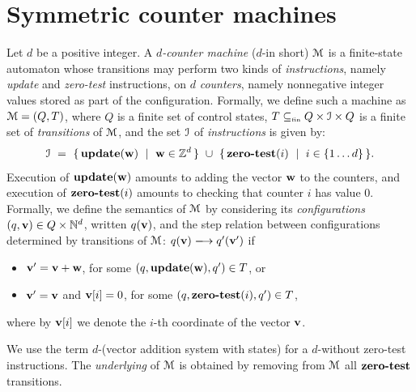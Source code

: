 \section{Symmetric counter machines} \label{sec:model}

Let $d$ be a positive integer.
A \emph{$d$-counter machine} ($d$-\cm in short) 
$\mathcal{M}$
is a finite-state automaton whose transitions
may perform two kinds of \emph{instructions},
namely \emph{update} and \emph{zero-test} instructions,
on $d$ \emph{counters}, namely nonnegative integer values
stored as part of the configuration.
Formally, we define such a machine as 
$\mathcal{M} = (Q,T)$, where $Q$ is a finite set of control states,
$T\subseteq_\text{\tiny fin} Q\times\mathcal{I}\times Q$ is a finite set of 
\emph{transitions} of $\mathcal{M}$,
and the set $\mathcal{I}$ of \emph{instructions} is given by:
\[
\Instr \ = \ \setof{\updinstr{\vr w}}{\vr w\in\Z^d} \ \cup \ 
\setof{\ztinstr{i}}{i\in \setto d}.
\]
Execution of $\textbf{update}(\mathbf{w})$ amounts to adding
the vector
$\mathbf{w}$ to the counters, and execution of 
$\textbf{zero-test}(i)$ amounts to checking that counter $i$
has value 0.
Formally, we define the semantics of $\mathcal{M}$ by considering
its \emph{configurations} $(q,\mathbf{v}) \in Q\times \mathbb{N}^d$, written $q(\mathbf{v})$, and
the step relation between configurations determined by 
transitions of $\mathcal{M}$:
$q(\vr v) \step q'(\vr v')$ if 
\begin{itemize}
\item 
$\mathbf{v}' = \mathbf{v} + \mathbf{w}$,  for some  $(q,\textbf{update}(\mathbf{w}),q')\in T$, or
\item  
$\mathbf{v}' = \mathbf{v}$ and $\mathbf{v}[i]=0$, for some 
$(q,\textbf{zero-test}(i), q')\in T$,
\end{itemize}
where by $\mathbf{v}[i]$ we denote the $i$-th coordinate of the vector $\mathbf{v}$.

We use the term $d$-\vass (vector addition system with states)
for a $d$-\cm without zero-test instructions.
The \emph{underlying} \vass of $\mathcal{M}$ is
obtained by removing from $\mathcal{M}$ all $\textbf{zero-test}$ transitions.


